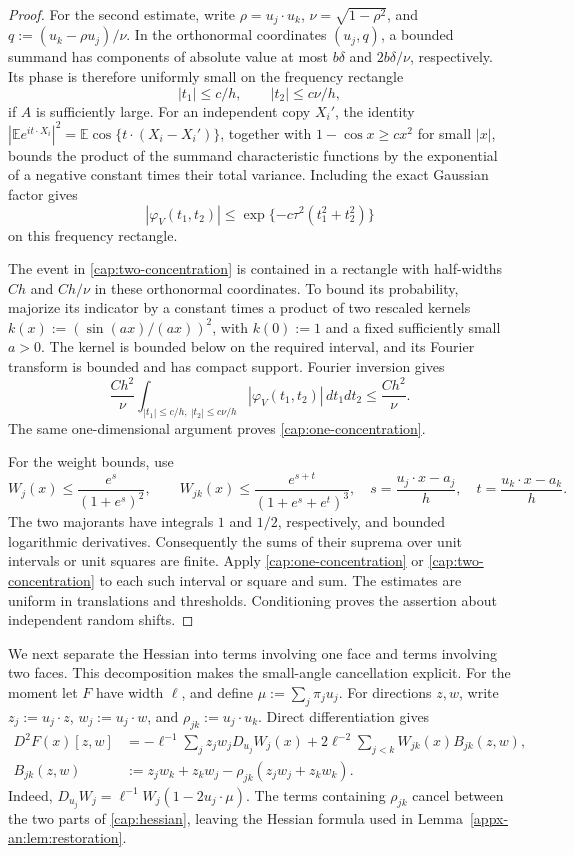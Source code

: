 \documentclass[11pt,letterpaper]{article}
\theoremstyle{remark}
\newcommand{\E}{\mathbb E}
\begin{document}
\begin{proof}
For the second estimate, write \(\rho=u_j\cdot u_k\),
\(\nu=\sqrt{1-\rho^2}\), and \(q:=(u_k-\rho u_j)/\nu\).
In the orthonormal coordinates \((u_j,q)\), a bounded summand has
components of absolute value at most \(b\delta\) and
\(2b\delta/\nu\), respectively. Its phase is therefore uniformly
small on the frequency rectangle
\[
 |t_1|\le c/h,\qquad |t_2|\le c\nu/h,
\]
if \(A\) is sufficiently large. For an independent copy \(X_i'\),
the identity
\(\left|\E e^{it\cdot X_i}\right|^2
 =\E\cos\{t\cdot(X_i-X_i')\}\), together with
\(1-\cos x\ge c x^2\) for small \(|x|\), bounds the product of
the summand characteristic functions by the exponential of a
negative constant times their total variance. Including the exact
Gaussian factor gives
\[
 |\varphi_V(t_1,t_2)|\le
       \exp\{-c\tau^2(t_1^2+t_2^2)\}
\]
on this frequency rectangle.

The event in \eqref{cap:two-concentration} is contained in a
rectangle with half-widths \(Ch\) and \(Ch/\nu\) in these
orthonormal coordinates. To bound its probability, majorize its
indicator by a constant times a product of two rescaled kernels
\(k(x):=(\sin(ax)/(ax))^2\), with \(k(0):=1\) and a fixed
sufficiently small \(a>0\). The kernel is bounded below on the
required interval, and its Fourier transform is bounded and has
compact support. Fourier inversion gives
\[
 \frac{Ch^2}{\nu}
 \int_{|t_1|\le c/h,\ |t_2|\le c\nu/h}
        |\varphi_V(t_1,t_2)|\,dt_1dt_2
 \le \frac{Ch^2}{\nu}.
\]
The same one-dimensional argument proves
\eqref{cap:one-concentration}.

For the weight bounds, use
\[
 W_j(x)\le \frac{e^{s}}{(1+e^s)^2},\qquad
 W_{jk}(x)\le \frac{e^{s+t}}{(1+e^s+e^t)^3},
 \quad s=\frac{u_j\cdot x-a_j}{h},\quad
 t=\frac{u_k\cdot x-a_k}{h}.
\]
The two majorants have integrals \(1\) and \(1/2\), respectively,
and bounded logarithmic derivatives. Consequently the sums of
their suprema over unit intervals or unit squares are finite.
Apply \eqref{cap:one-concentration} or
\eqref{cap:two-concentration} to each such interval or square and
sum. The estimates are uniform in translations and thresholds.
Conditioning proves the assertion about independent random shifts.
\end{proof}

We next separate the Hessian into terms involving one face and
terms involving two faces. This decomposition makes the small-angle
cancellation explicit. For the moment let \(F\) have width
\(\ell\), and define \(\mu:=\sum_j\pi_j u_j\). For directions
\(z,w\), write \(z_j:=u_j\cdot z\), \(w_j:=u_j\cdot w\), and
\(\rho_{jk}:=u_j\cdot u_k\). Direct differentiation gives
\begin{align}
 D^2F(x)[z,w]
 &=-\ell^{-1}\sum_jz_jw_j D_{u_j}W_j(x)
     +2\ell^{-2}\sum_{j<k}W_{jk}(x)B_{jk}(z,w),
 \label{cap:hessian}\\
 B_{jk}(z,w)
 &:=z_jw_k+z_kw_j-\rho_{jk}(z_jw_j+z_kw_k).
 \label{cap:pair-coefficient}
\end{align}
Indeed, \(D_{u_j}W_j=\ell^{-1}W_j(1-2u_j\cdot\mu)\).
The terms containing \(\rho_{jk}\) cancel between the two parts
of \eqref{cap:hessian}, leaving the Hessian formula used in
Lemma~\ref{appx-an:lem:restoration}.
\end{document}
